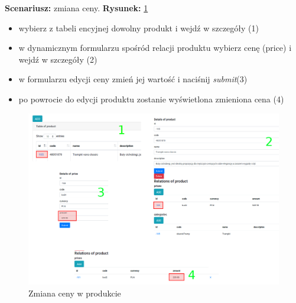 \noindent
\textbf{Scenariusz: } zmiana ceny. \textbf{Rysunek: } \ref{zmianacenyproduktu} 
\begin{itemize}
	\item wybierz z tabeli encyjnej dowolny produkt i wejdź w szczegóły (1)
	\item w dynamicznym formularzu spośród relacji produktu wybierz cenę (price) i wejdź w szczegóły (2) 
	\item w formularzu edycji ceny zmień jej wartość i naciśnij \textit{submit}(3)
	\item po powrocie do edycji produktu zostanie wyświetlona zmieniona cena (4)
\end{itemize}
\begin{figure}
	\begin{center}
		\includegraphics[scale=1.3]{zmianacenyproduktu.png}
	\end{center}
	\caption{{\color{black}Zmiana ceny w produkcie}} \label{zmianacenyproduktu}
\end{figure}









